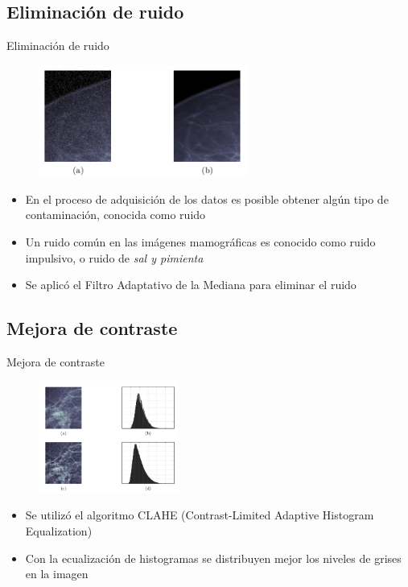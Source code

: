\documentclass{beamer}
\begin{document}
\subsection{Eliminación de ruido}
\begin{frame}{Eliminación de ruido}
\transdissolve
  \pause
  \begin{figure}
    \centering
     \includegraphics[height=3.66cm]{images/three.png}
  \end{figure}
  \pause
  \begin{itemize}[<+-| alert@+>]
    \item En el proceso de adquisición de los datos es posible obtener algún tipo de contaminación, conocida como ruido
    \item Un ruido común en las imágenes mamográficas es conocido como ruido impulsivo, o ruido de \textit{sal y pimienta}
    \item Se aplicó el Filtro Adaptativo de la Mediana para eliminar el ruido
  \end{itemize}
\end{frame}

\subsection{Mejora de contraste}
\begin{frame}{Mejora de contraste}
\transdissolve
  \pause
  \begin{figure}
    \centering
     \includegraphics[height=3.66cm]{images/four.png}
  \end{figure}
  \pause
  \begin{itemize}[<+-| alert@+>]
    \item Se utilizó el algoritmo CLAHE (Contrast-Limited Adaptive Histogram Equalization)
    \item Con la ecualización de histogramas se distribuyen mejor los niveles de grises en la imagen
  \end{itemize}
\end{frame}
\end{document}
